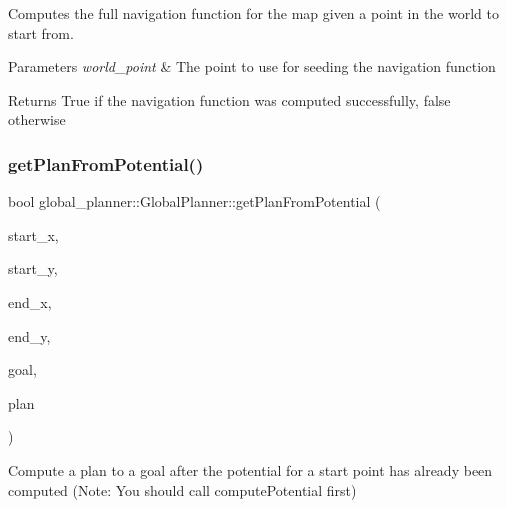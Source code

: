 Computes the full navigation function for the map given a point in the world to start from. 


\begin{DoxyParams}{Parameters}
{\em world\+\_\+point} & The point to use for seeding the navigation function \\
\hline
\end{DoxyParams}
\begin{DoxyReturn}{Returns}
True if the navigation function was computed successfully, false otherwise 
\end{DoxyReturn}
\mbox{\label{classglobal__planner_1_1_global_planner_a4bae9ef237ecc53aa3027abd3dc063b5}} 
\subsubsection{\texorpdfstring{get\+Plan\+From\+Potential()}{getPlanFromPotential()}}
{\footnotesize\ttfamily bool global\+\_\+planner\+::\+Global\+Planner\+::get\+Plan\+From\+Potential (\begin{DoxyParamCaption}\item[{double}]{start\+\_\+x,  }\item[{double}]{start\+\_\+y,  }\item[{double}]{end\+\_\+x,  }\item[{double}]{end\+\_\+y,  }\item[{const geometry\+\_\+msgs\+::\+Pose\+Stamped \&}]{goal,  }\item[{std\+::vector$<$ geometry\+\_\+msgs\+::\+Pose\+Stamped $>$ \&}]{plan }\end{DoxyParamCaption})}



Compute a plan to a goal after the potential for a start point has already been computed (Note\+: You should call compute\+Potential first) 


